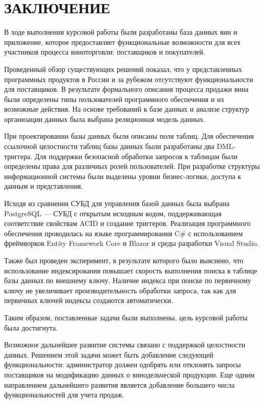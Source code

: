 \chapter*{ЗАКЛЮЧЕНИЕ}

В ходе выполнения курсовой работы были разработаны база данных вин и приложение, которое предоставляет функциональные возможности для всех участников процесса виноторговли: поставщиков и покупателей.

Проведенный обзор существующих решений показал, что у представленных программных продуктов в России и за рубежом отсутствуют функциональности для поставщиков. В результате формального описания процесса продажи вина были определены типы пользователей программного обеспечения и их возможные действия. На основе требований к базе данных и анализе структур организации данных была выбрана реляционная модель данных.

При проектировании базы данных были описаны поля таблиц. Для обеспечения ссылочной целостности таблиц базы данных были разработаны два DML-триггера. Для поддержки безопасной обработки запросов к таблицам были определены права для различных ролей пользователей. При разработке структуры информационной системы были выделены уровни бизнес-логики, доступа к данным и представления.

Исходя из сравнения СУБД для управления базой данных была выбрана PostgreSQL --- СУБД с открытым исходным кодом, поддерживающая соответствие свойствам ACID и создание триггеров. Реализация программного обеспечения проводилась на языке программирования C\# с использованием фреймворков Entity Framework Core и Blazor и среды разработки Visual Studio.

Также был проведен эксперимент, в результате которого было выяснено, что использование индексирования повышает скорость выполнения поиска в таблице базы данных по внешнему ключу. Наличие индекса при поиске по первичному ключу не увеличивает производительность обработки запроса, так как для первичных ключей индексы создаются автоматически.

Таким образом, поставленные задачи были выполнены, цель курсовой работы была достигнута.

Возможное дальнейшее развитие системы связано с поддержкой целостности данных. Решением этой задачи может быть добавление следующей функциональности: администратор должен одобрять или отклонять запросы поставщиков на модификацию данных о винодельческой продукции. Еще одним направлением дальнейшего развития является добавление большего числа функциональностей для учета продаж.
